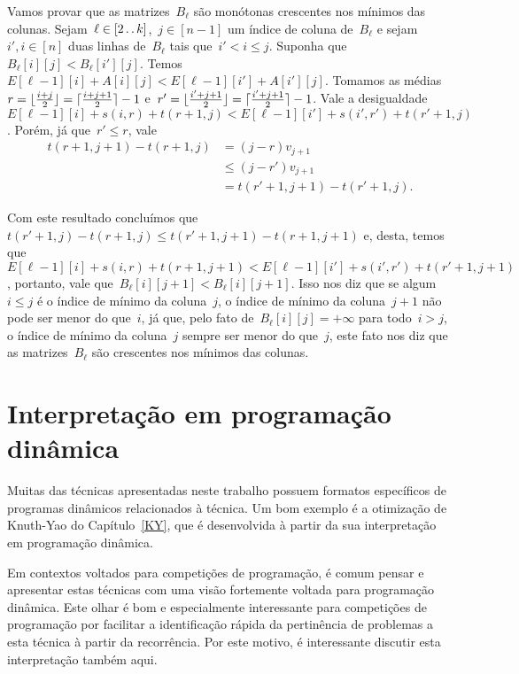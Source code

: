 Vamos provar que as matrizes~$B_\ell$ são monótonas crescentes nos mínimos das colunas. Sejam~${ \ell \in [2 \,.\,.\, k] }$,~${ j \in [n-1] }$ um índice de coluna de~${ B_\ell }$ e sejam~${ i',i \in [n] }$ duas linhas de~$B_\ell$ tais que~${ i' < i \leq j }$. Suponha que~${ B_\ell[i][j] < B_\ell[i'][j] }$. Temos~${ E[\ell-1][i] + A[i][j] < E[\ell-1][i'] + A[i'][j] }$. Tomamos as médias~${ r = \lfloor\frac{i+j}{2}\rfloor = \lceil\frac{i+j+1}{2}\rceil - 1 }$ e~${ r' = \lfloor\frac{i'+j+1}{2}\rfloor = \lceil\frac{i'+j+1}{2}\rceil - 1 }$. Vale a desigualdade~${ E[\ell-1][i] + s(i,r) + t(r+1,j) < E[\ell-1][i'] + s(i',r') + t(r'+1,j) }$. Porém, já que~${ r' \leq r }$, vale
\begin{equation*}
\begin{array}{rl}
t(r+1,j+1) - t(r+1,j) & = (j-r)v_{j+1} \\
& \leq (j-r')v_{j+1} \\
& = t(r'+1,j+1) - t(r'+1,j) \text{.}
\end{array}
\end{equation*}
 
Com este resultado concluímos que~${ t(r'+1,j) - t(r+1,j) \leq t(r'+1,j+1) - t(r+1,j+1) }$ e, desta, temos que~${ E[\ell-1][i] + s(i,r) + t(r+1,j+1) < E[\ell-1][i'] + s(i',r') + t(r'+1,j+1) }$, portanto, vale que~${ B_\ell[i][j+1] < B_\ell[i][j+1] }$. Isso nos diz que se algum~${ i \leq j }$ é o índice de mínimo da coluna~$j$, o índice de mínimo da coluna~${j+1}$ não pode ser menor do que~$i$, já que, pelo fato de~${ B_\ell[i][j] = +\infty }$ para todo~${ i > j }$, o índice de mínimo da coluna~$j$ sempre ser menor do que~$j$, este fato nos diz que as matrizes~$B_\ell$ são crescentes nos mínimos das colunas.


\section{Interpretação em programação dinâmica} \label{DivConq:Inter_DP}

Muitas das técnicas apresentadas neste trabalho possuem formatos específicos de programas dinâmicos relacionados à técnica. Um bom exemplo é a otimização de Knuth-Yao do Capítulo~\ref{KY}, que é desenvolvida à partir da sua interpretação em programação dinâmica. 

Em contextos voltados para competições de programação, é comum pensar e apresentar estas técnicas com uma visão fortemente voltada para programação dinâmica. Este olhar é bom e especialmente interessante para competições de programação por facilitar a identificação rápida da pertinência de problemas a esta técnica à partir da recorrência. Por este motivo, é interessante discutir esta interpretação também aqui.


